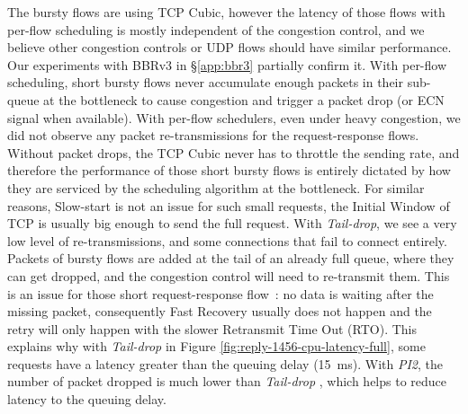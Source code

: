 The bursty flows are using TCP Cubic, however the latency of those
flows with per-flow scheduling is mostly independent of the congestion
control, and we believe other congestion controls or UDP flows should
have similar performance. Our experiments with BBRv3 in
\S\ref{app:bbr3} partially confirm it. With per-flow scheduling, short
bursty flows never accumulate enough packets in their sub-queue at the
bottleneck to cause congestion and trigger a packet drop (or ECN
signal when available). With per-flow schedulers, even under heavy
congestion, we did not observe any packet re-transmissions for the
request-response flows. Without packet drops, the TCP Cubic never has
to throttle the sending rate, and therefore the performance of those
short bursty flows is entirely dictated by how they are serviced by
the scheduling algorithm at the bottleneck. For similar reasons,
Slow-start is not an issue for such small requests, the Initial Window
of TCP is usually big enough to send the full request. With
\textit{Tail-drop}, we see a very low level of re-transmissions, and
some connections that fail to connect entirely. Packets of bursty
flows are added at the tail of an already full queue, where they can
get dropped, and the congestion control will need to re-transmit
them. This is an issue for those short request-response flow~: no data
is waiting after the missing packet, consequently Fast Recovery
\cite{fast-recovery} usually does not happen and the retry will only
happen with the slower Retransmit Time Out (RTO). This explains why
with \textit{Tail-drop} in Figure \ref{fig:reply-1456-cpu-latency-full},
some requests have a latency greater than the queuing delay
(15~ms). With \textit{PI2}, the number of packet dropped is much lower
than \textit{Tail-drop} \cite{pi2}, which helps to reduce latency to
the queuing delay.



